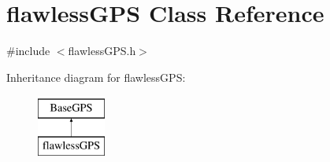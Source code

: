 \hypertarget{classflawless_g_p_s}{}\section{flawless\+G\+PS Class Reference}
\label{classflawless_g_p_s}


{\ttfamily \#include $<$flawless\+G\+P\+S.\+h$>$}

Inheritance diagram for flawless\+G\+PS\+:\begin{figure}[H]
\begin{center}
\leavevmode
\includegraphics[height=2.000000cm]{classflawless_g_p_s}
\end{center}
\end{figure}
